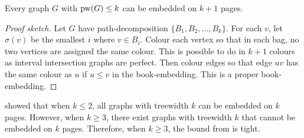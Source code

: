 \begin{theorem}
	Every graph \(G\) with \(\operatorname{pw}(G) \leq k\) can be embedded on $k + 1$ pages.
\end{theorem}

\begin{proof}[Proof sketch]
	Let $G$ have path-decomposition $\{B_1, B_2, \ldots , B_k\}$. For each $v$, let $\sigma(v)$ be the smallest $i$ where $v \in B_i$. Colour each vertex so that in each bag, no two vertices are assigned the same colour. This is possible to do in $k+1$ colours as interval intersection graphs are perfect. Then colour edges so that edge $uv$ has the same colour as $u$ if $u \leq v$ in the book-embedding. This is a proper book-embedding.
\end{proof}

\textcite{dujmovicGraphTreewidthGeometric2007} showed that when $k \leq 2$, all graphs with treewidth $k$ can be embedded on $k$ pages. However, when $k \geq 3$, there exist graphs with treewidth $k$ that cannot be embedded on $k$ pages. Therefore, when $k \geq 3$, the bound from \textcite{ganleyPagenumberTrees2001} is tight. 